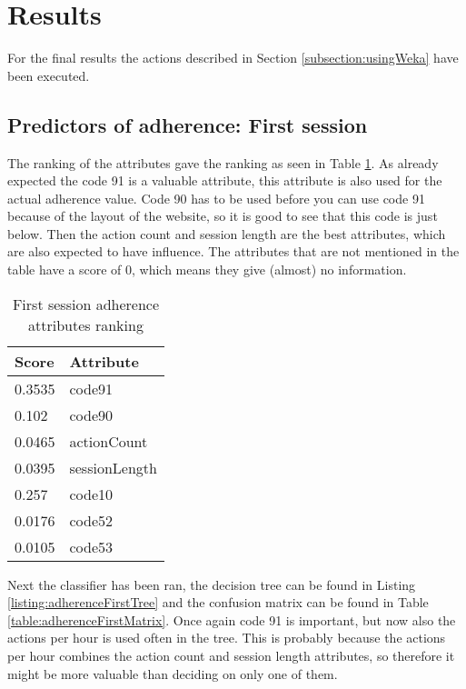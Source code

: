 \section{Results}
For the final results the actions described in Section \ref{subsection:usingWeka} have been executed.

\subsection{Predictors of adherence: First session}
The ranking of the attributes gave the ranking as seen in Table \ref{table:adherenceFirstAttributes}. As already expected the code 91 is a valuable attribute, this attribute is also used for the actual adherence value. Code 90 has to be used before you can use code 91 because of the layout of the website, so it is good to see that this code is just below. Then the action count and session length are the best attributes, which are also expected to have influence. The attributes that are not mentioned in the table have a score of 0, which means they give (almost) no information.

\begin{table}[]
	\centering
	\caption{First session adherence \\attributes ranking}
	\label{table:adherenceFirstAttributes}
	\begin{tabular}{@{}ll@{}}
		\toprule
		\textbf{Score} & \textbf{Attribute} \\ \midrule
		0.3535         & code91             \\
		0.102          & code90             \\
		0.0465         & actionCount        \\
		0.0395         & sessionLength      \\
		0.257          & code10             \\
		0.0176         & code52             \\
		0.0105         & code53             \\ \bottomrule
	\end{tabular}
\end{table}

Next the  classifier has been ran, the decision tree can be found in Listing \ref{listing:adherenceFirstTree} and the confusion matrix can be found in Table \ref{table:adherenceFirstMatrix}. Once again code 91 is important, but now also the actions per hour is used often in the tree. This is probably because the actions per hour combines the action count and session length attributes, so therefore it might be more valuable than deciding on only one of them. 

